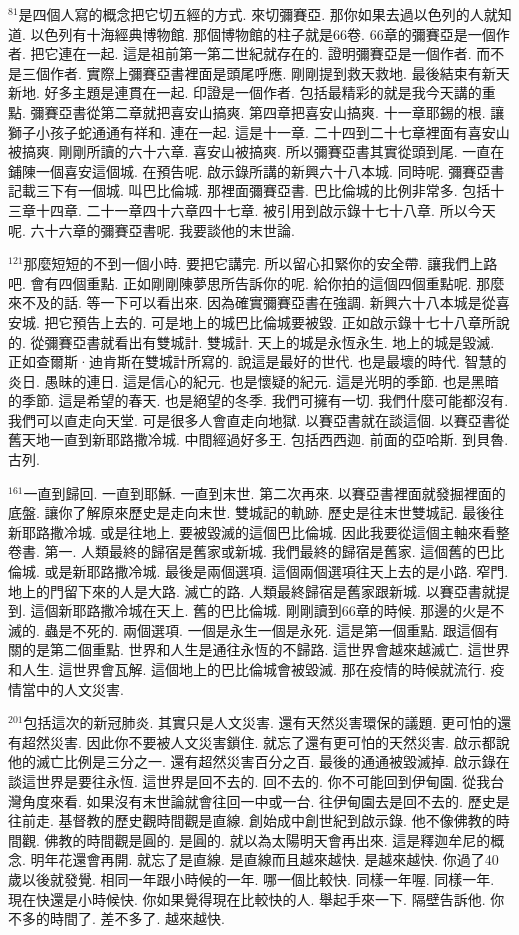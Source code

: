\documentclass{book}
\begin{document}
$^{81}$是四個人寫的概念把它切五經的方式.
來切彌賽亞.
那你如果去過以色列的人就知道.
以色列有十海經典博物館.
那個博物館的柱子就是66卷.
66章的彌賽亞是一個作者.
把它連在一起.
這是祖前第一第二世紀就存在的.
證明彌賽亞是一個作者.
而不是三個作者.
實際上彌賽亞書裡面是頭尾呼應.
剛剛提到救天救地.
最後結束有新天新地.
好多主題是連貫在一起.
印證是一個作者.
包括最精彩的就是我今天講的重點.
彌賽亞書從第二章就把喜安山搞爽.
第四章把喜安山搞爽.
十一章耶錫的根.
讓獅子小孩子蛇通通有祥和.
連在一起.
這是十一章.
二十四到二十七章裡面有喜安山被搞爽.
剛剛所讀的六十六章.
喜安山被搞爽.
所以彌賽亞書其實從頭到尾.
一直在鋪陳一個喜安這個城.
在預告呢.
啟示錄所講的新興六十八本城.
同時呢.
彌賽亞書記載三下有一個城.
叫巴比倫城.
那裡面彌賽亞書.
巴比倫城的比例非常多.
包括十三章十四章.
二十一章四十六章四十七章.
被引用到啟示錄十七十八章.
所以今天呢.
六十六章的彌賽亞書呢.
我要談他的末世論.

$^{121}$那麼短短的不到一個小時.
要把它講完.
所以留心扣緊你的安全帶.
讓我們上路吧.
會有四個重點.
正如剛剛陳夢思所告訴你的呢.
給你拍的這個四個重點呢.
那麼來不及的話.
等一下可以看出來.
因為確實彌賽亞書在強調.
新興六十八本城是從喜安城.
把它預告上去的.
可是地上的城巴比倫城要被毀.
正如啟示錄十七十八章所說的.
從彌賽亞書就看出有雙城計.
雙城計.
天上的城是永恆永生.
地上的城是毀滅.
正如查爾斯·迪肯斯在雙城計所寫的.
說這是最好的世代.
也是最壞的時代.
智慧的炎日.
愚昧的連日.
這是信心的紀元.
也是懷疑的紀元.
這是光明的季節.
也是黑暗的季節.
這是希望的春天.
也是絕望的冬季.
我們可擁有一切.
我們什麼可能都沒有.
我們可以直走向天堂.
可是很多人會直走向地獄.
以賽亞書就在談這個.
以賽亞書從舊天地一直到新耶路撒冷城.
中間經過好多王.
包括西西迦.
前面的亞哈斯.
到貝魯.
古列.

$^{161}$一直到歸回.
一直到耶穌.
一直到末世.
第二次再來.
以賽亞書裡面就發掘裡面的底盤.
讓你了解原來歷史是走向末世.
雙城記的軌跡.
歷史是往末世雙城記.
最後往新耶路撒冷城.
或是往地上.
要被毀滅的這個巴比倫城.
因此我要從這個主軸來看整卷書.
第一.
人類最終的歸宿是舊家或新城.
我們最終的歸宿是舊家.
這個舊的巴比倫城.
或是新耶路撒冷城.
最後是兩個選項.
這個兩個選項往天上去的是小路.
窄門.
地上的門留下來的人是大路.
滅亡的路.
人類最終歸宿是舊家跟新城.
以賽亞書就提到.
這個新耶路撒冷城在天上.
舊的巴比倫城.
剛剛讀到66章的時候.
那邊的火是不滅的.
蟲是不死的.
兩個選項.
一個是永生一個是永死.
這是第一個重點.
跟這個有關的是第二個重點.
世界和人生是通往永恆的不歸路.
這世界會越來越滅亡.
這世界和人生.
這世界會瓦解.
這個地上的巴比倫城會被毀滅.
那在疫情的時候就流行.
疫情當中的人文災害.

$^{201}$包括這次的新冠肺炎.
其實只是人文災害.
還有天然災害環保的議題.
更可怕的還有超然災害.
因此你不要被人文災害鎖住.
就忘了還有更可怕的天然災害.
啟示都說他的滅亡比例是三分之一.
還有超然災害百分之百.
最後的通通被毀滅掉.
啟示錄在談這世界是要往永恆.
這世界是回不去的.
回不去的.
你不可能回到伊甸園.
從我台灣角度來看.
如果沒有末世論就會往回一中或一台.
往伊甸園去是回不去的.
歷史是往前走.
基督教的歷史觀時間觀是直線.
創始成中創世紀到啟示錄.
他不像佛教的時間觀.
佛教的時間觀是圓的.
是圓的.
就以為太陽明天會再出來.
這是釋迦牟尼的概念.
明年花還會再開.
就忘了是直線.
是直線而且越來越快.
是越來越快.
你過了40歲以後就發覺.
相同一年跟小時候的一年.
哪一個比較快.
同樣一年喔.
同樣一年.
現在快還是小時候快.
你如果覺得現在比較快的人.
舉起手來一下.
隔壁告訴他.
你不多的時間了.
差不多了.
越來越快.
\end{document}

